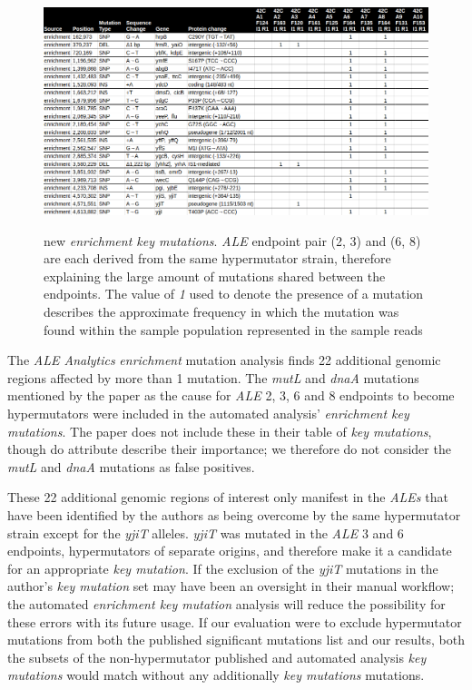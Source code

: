 \documentclass[12pt,final,masters,chapterheads]{ucsd}  %
\begin{document}
\begin{figure}[H]
  \caption{new \textit{enrichment key mutations}. \textit{ALE} endpoint pair (2, 3) and (6, 8) are each derived from the same hypermutator strain, therefore explaining the large amount of mutations shared between the endpoints. The value of \textit{1} used to denote the presence of a mutation describes the approximate frequency in which the mutation was found within the sample population represented in the sample reads \cite{breseq_paper}}
  \centering
  \includegraphics[width=\textwidth]{42c_new_enrich_muts.png}
  \label{fig:42c_new_enrich_muts}
\end{figure}

The\textit{ ALE Analytics} \textit{enrichment} mutation analysis finds 22 additional genomic regions affected by more than 1 mutation. The \textit{mutL} and \textit{dnaA} mutations mentioned by the paper as the cause for \textit{ALE} 2, 3, 6 and 8 endpoints to become hypermutators were included in the automated analysis' \textit{enrichment key mutations}. The paper does not include these in their table of \textit{key mutations}, though do attribute describe their importance; we therefore do not consider the \textit{mutL} and \textit{dnaA} mutations as false positives.

These 22 additional genomic regions of interest only manifest in the \textit{ALEs} that have been identified by the authors as being overcome by the same hypermutator strain except for the \textit{yjiT} alleles. \textit{yjiT} was mutated in the \textit{ALE} 3 and 6 endpoints, hypermutators of separate origins, and therefore make it a candidate for an appropriate \textit{key mutation}. If the exclusion of the \textit{yjiT} mutations in the author's \textit{key mutation} set may have been an oversight in their manual workflow; the automated \textit{enrichment key mutation} analysis will reduce the possibility for these errors with its future usage. If our evaluation were to exclude hypermutator mutations from both the published significant mutations list and our results, both the subsets of the non-hypermutator published and automated analysis \textit{key mutations} would match without any additionally \textit{key mutations} mutations. 
\end{document}
